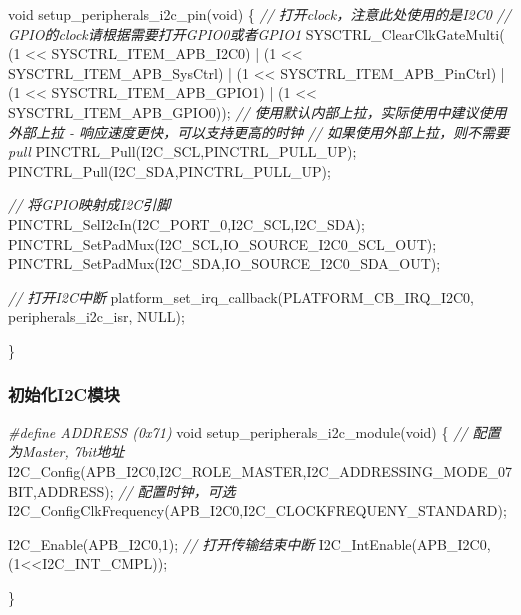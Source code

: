 \documentclass[
  12pt,
]{book}
\newenvironment{Shaded}{\begin{snugshade}}{\end{snugshade}}
\newcommand{\CommentTok}[1]{\textcolor[rgb]{0.56,0.35,0.01}{\textit{#1}}}
\newcommand{\DataTypeTok}[1]{\textcolor[rgb]{0.13,0.29,0.53}{#1}}
\newcommand{\DecValTok}[1]{\textcolor[rgb]{0.00,0.00,0.81}{#1}}
\newcommand{\NormalTok}[1]{#1}
\newcommand{\PreprocessorTok}[1]{\textcolor[rgb]{0.56,0.35,0.01}{\textit{#1}}}
\begin{document}
\begin{Shaded}
\begin{Highlighting}[]
\DataTypeTok{void}\NormalTok{ setup_peripherals_i2c_pin(}\DataTypeTok{void}\NormalTok{)}
\NormalTok{\{}
  \CommentTok{// 打开clock，注意此处使用的是I2C0}
  \CommentTok{// GPIO的clock请根据需要打开GPIO0或者GPIO1}
\NormalTok{  SYSCTRL_ClearClkGateMulti(    (}\DecValTok{1}\NormalTok{ << SYSCTRL_ITEM_APB_I2C0)}
\NormalTok{                                | (}\DecValTok{1}\NormalTok{ << SYSCTRL_ITEM_APB_SysCtrl)}
\NormalTok{                                | (}\DecValTok{1}\NormalTok{ << SYSCTRL_ITEM_APB_PinCtrl)}
\NormalTok{                                | (}\DecValTok{1}\NormalTok{ << SYSCTRL_ITEM_APB_GPIO1)}
\NormalTok{                                | (}\DecValTok{1}\NormalTok{ << SYSCTRL_ITEM_APB_GPIO0));}
  \CommentTok{// 使用默认内部上拉，实际使用中建议使用外部上拉 - 响应速度更快，可以支持更高的时钟}
  \CommentTok{// 如果使用外部上拉，则不需要pull}
\NormalTok{  PINCTRL_Pull(I2C_SCL,PINCTRL_PULL_UP);}
\NormalTok{  PINCTRL_Pull(I2C_SDA,PINCTRL_PULL_UP);}
  
  \CommentTok{// 将GPIO映射成I2C引脚}
\NormalTok{  PINCTRL_SelI2cIn(I2C_PORT_0,I2C_SCL,I2C_SDA);}
\NormalTok{  PINCTRL_SetPadMux(I2C_SCL,IO_SOURCE_I2C0_SCL_OUT);}
\NormalTok{  PINCTRL_SetPadMux(I2C_SDA,IO_SOURCE_I2C0_SDA_OUT);}
  
  \CommentTok{// 打开I2C中断}
\NormalTok{  platform_set_irq_callback(PLATFORM_CB_IRQ_I2C0, peripherals_i2c_isr, NULL);}
  
\NormalTok{\}}
\end{Highlighting}
\end{Shaded}

\hypertarget{ux521dux59cbux5316i2cux6a21ux5757-6}{%
\subsubsection{初始化I2C模块}\label{ux521dux59cbux5316i2cux6a21ux5757-6}}

\begin{Shaded}
\begin{Highlighting}[]
\PreprocessorTok{#define ADDRESS (0x71)}
\DataTypeTok{void}\NormalTok{ setup_peripherals_i2c_module(}\DataTypeTok{void}\NormalTok{)}
\NormalTok{\{}
  \CommentTok{// 配置为Master, 7bit地址}
\NormalTok{  I2C_Config(APB_I2C0,I2C_ROLE_MASTER,I2C_ADDRESSING_MODE_07BIT,ADDRESS);}
  \CommentTok{// 配置时钟，可选}
\NormalTok{  I2C_ConfigClkFrequency(APB_I2C0,I2C_CLOCKFREQUENY_STANDARD);}
  
\NormalTok{  I2C_Enable(APB_I2C0,}\DecValTok{1}\NormalTok{);}
  \CommentTok{// 打开传输结束中断}
\NormalTok{  I2C_IntEnable(APB_I2C0,(}\DecValTok{1}\NormalTok{<<I2C_INT_CMPL));}

\NormalTok{\}}
\end{Highlighting}
\end{Shaded}
\end{document}
